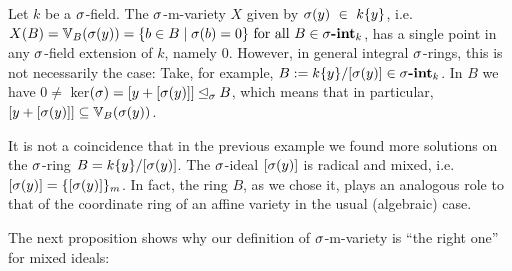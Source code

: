 \begin{ex}
Let $k$ be a $\sigma$-field. The $\sigma$-m-variety $X$ given by $\sigma(y)~\in~k\{y\}$, i.e. $X(B) = \mathbb{V}_B(\sigma(y)) = \{ b \in B \mid \sigma(b) = 0 \} \text{ for all } B \in \sigma\text{{\normalfont\textbf{-int}}}_k$, has a single point in any $\sigma$-field extension of $k$, namely $0$. However, in general integral $\sigma$-rings,
this is not necessarily the case: Take, for example, $B:= k\{y\}/[\sigma(y)] \in \sigma\text{{\normalfont\textbf{-int}}}_k$. In $B$ we have $0 \neq $ ker$(\sigma) = [y+ [\sigma(y)]] \unlhd_{\sigma} B$, which means that in particular, $[y + [\sigma(y)]] \subseteq \mathbb{V}_B(\sigma(y))$.
\end{ex}

It is not a coincidence that in the previous example we found more solutions on the $\sigma$-ring $B = k\{y\}/[\sigma(y)]$. The $\sigma$-ideal $[\sigma(y)]$ is radical and mixed, i.e. $[\sigma(y)] = \{ [\sigma(y)] \}_m$.
In fact, the ring $B$, as we chose it, plays an analogous role to that of the coordinate ring of an affine variety in the usual (algebraic) case.

The next proposition shows why our definition of $\sigma$-m-variety is ``the right one'' for mixed ideals:

